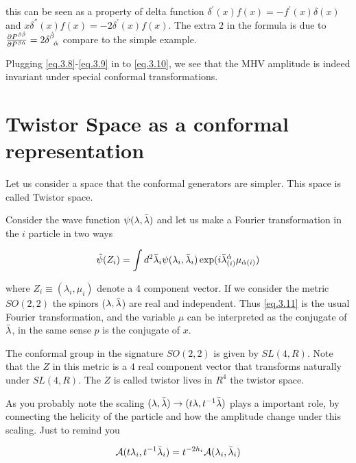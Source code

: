 this can be seen as a property of delta function $\delta^{'}(x)f(x) = -f^{'}(x)\delta(x) $ and $x\delta^{''}(x)f(x) = -2\delta^{'}(x)f(x) $. The extra $2$ in the formula is due to $\frac{\partial P^{\beta \dot{\beta}}}{\partial P^{\beta \dot{\alpha}}} = 2 \delta^{\dot{\beta}}_{\;\; \dot{\alpha}}$ compare to the simple example.


Plugging \eqref{eq.3.8}-\eqref{eq.3.9} in to \eqref{eq.3.10}, we see that the MHV amplitude is indeed invariant under special conformal transformations.



\section{Twistor Space as a conformal representation}


Let us consider a space that the conformal generators are simpler. This space is called Twistor space.

Consider the wave function $\psi(\lambda,\bar{\lambda})$ and let us make a Fourier transformation in the $i$ particle in two ways

\begin{equation}
\tilde{\psi}(Z_{i}) = \int d^{2}\bar{\lambda}_{i}\psi(\lambda_{i},\bar{\lambda}_{i}) \exp(i\bar{\lambda}^{\dot{\alpha}}_{(i)}\mu_{\dot{\alpha}(i)})  
\label{eq.3.11}
\end{equation}


where $Z_{i} \equiv (\lambda_{i},\mu_{i})$ denote a 4 component vector. If we consider the metric $SO(2,2)$ the spinors ($\lambda,\bar{\lambda}$) are real and independent. Thus \eqref{eq.3.11}   is the usual Fourier transformation, and the variable $\mu$ can be interpreted as  the conjugate of $\bar{\lambda}$, in the same sense  $p$ is the conjugate of $x$. 

The conformal group in the signature $SO(2,2)$ is given by $SL(4,R)$. Note that the $Z$ in this metric is a $4$ real component vector that transforms naturally under $SL(4,R)$. The $Z$ is called twistor  lives in  $R^{4}$ the twistor space.


As you probably note the scaling $(\lambda,\bar{\lambda}) \rightarrow ( t\lambda,t^{-1}\bar{\lambda})   $ plays a important role, by connecting the helicity of the particle and how the amplitude change under this scaling. Just to remind you 

\begin{equation}
\mathcal{A}(t\lambda_{i},t^{-1}\bar{\lambda}_{i}) = t^{-2h_{i}}\mathcal{A}(\lambda_{i},\bar{\lambda}_{i})
\end{equation}

